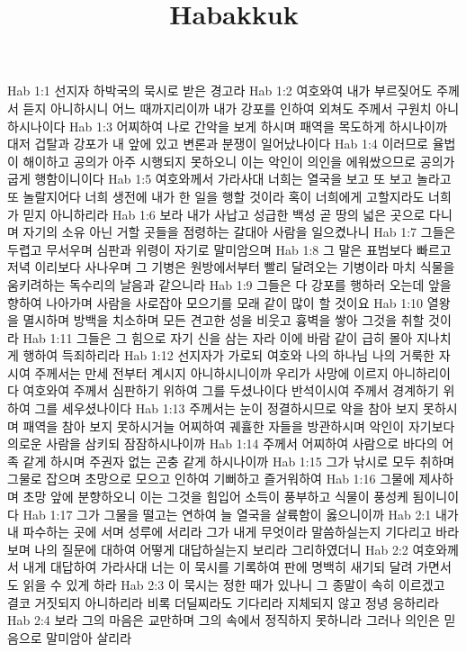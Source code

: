 

\title{Habakkuk}

Hab 1:1  선지자 하박국의 묵시로 받은 경고라
Hab 1:2  여호와여 내가 부르짖어도 주께서 듣지 아니하시니 어느 때까지리이까 내가 강포를 인하여 외쳐도 주께서 구원치 아니하시나이다
Hab 1:3  어찌하여 나로 간악을 보게 하시며 패역을 목도하게 하시나이까 대저 겁탈과 강포가 내 앞에 있고 변론과 분쟁이 일어났나이다
Hab 1:4  이러므로 율법이 해이하고 공의가 아주 시행되지 못하오니 이는 악인이 의인을 에워쌌으므로 공의가 굽게 행함이니이다
Hab 1:5  여호와께서 가라사대 너희는 열국을 보고 또 보고 놀라고 또 놀랄지어다 너희 생전에 내가 한 일을 행할 것이라 혹이 너희에게 고할지라도 너희가 믿지 아니하리라
Hab 1:6  보라 내가 사납고 성급한 백성 곧 땅의 넓은 곳으로 다니며 자기의 소유 아닌 거할 곳들을 점령하는 갈대아 사람을 일으켰나니
Hab 1:7  그들은 두렵고 무서우며 심판과 위령이 자기로 말미암으며
Hab 1:8  그 말은 표범보다 빠르고 저녁 이리보다 사나우며 그 기병은 원방에서부터 빨리 달려오는 기병이라 마치 식물을 움키려하는 독수리의 날음과 같으니라
Hab 1:9  그들은 다 강포를 행하러 오는데 앞을 향하여 나아가며 사람을 사로잡아 모으기를 모래 같이 많이 할 것이요
Hab 1:10  열왕을 멸시하며 방백을 치소하며 모든 견고한 성을 비웃고 흉벽을 쌓아 그것을 취할 것이라
Hab 1:11  그들은 그 힘으로 자기 신을 삼는 자라 이에 바람 같이 급히 몰아 지나치게 행하여 득죄하리라
Hab 1:12  선지자가 가로되 여호와 나의 하나님 나의 거룩한 자시여 주께서는 만세 전부터 계시지 아니하시니이까 우리가 사망에 이르지 아니하리이다 여호와여 주께서 심판하기 위하여 그를 두셨나이다 반석이시여 주께서 경계하기 위하여 그를 세우셨나이다
Hab 1:13  주께서는 눈이 정결하시므로 악을 참아 보지 못하시며 패역을 참아 보지 못하시거늘 어찌하여 궤휼한 자들을 방관하시며 악인이 자기보다 의로운 사람을 삼키되 잠잠하시나이까
Hab 1:14  주께서 어찌하여 사람으로 바다의 어족 같게 하시며 주권자 없는 곤충 같게 하시나이까
Hab 1:15  그가 낚시로 모두 취하며 그물로 잡으며 초망으로 모으고 인하여 기뻐하고 즐거워하여
Hab 1:16  그물에 제사하며 초망 앞에 분향하오니 이는 그것을 힘입어 소득이 풍부하고 식물이 풍성케 됨이니이다
Hab 1:17  그가 그물을 떨고는 연하여 늘 열국을 살륙함이 옳으니이까
Hab 2:1  내가 내 파수하는 곳에 서며 성루에 서리라 그가 내게 무엇이라 말씀하실는지 기다리고 바라보며 나의 질문에 대하여 어떻게 대답하실는지 보리라 그리하였더니
Hab 2:2  여호와께서 내게 대답하여 가라사대 너는 이 묵시를 기록하여 판에 명백히 새기되 달려 가면서도 읽을 수 있게 하라
Hab 2:3  이 묵시는 정한 때가 있나니 그 종말이 속히 이르겠고 결코 거짓되지 아니하리라 비록 더딜찌라도 기다리라 지체되지 않고 정녕 응하리라
Hab 2:4  보라 그의 마음은 교만하며 그의 속에서 정직하지 못하니라 그러나 의인은 믿음으로 말미암아 살리라
